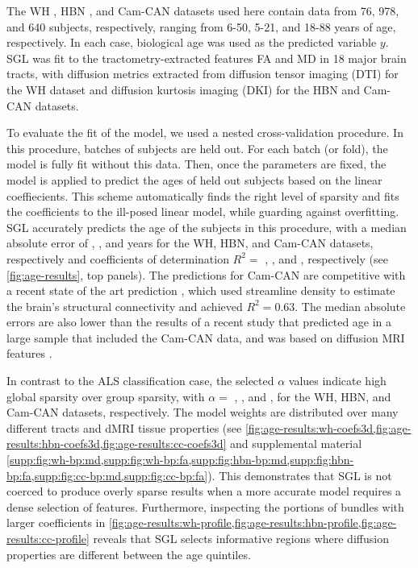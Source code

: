 \documentclass[10pt,%
               aps,%
               prl,%
               preprint,%
               superscriptaddress,%
               preprintnumbers,%
               amsmath,%
               floatfix,%
               endfloats*]{revtex4-1}
\begin{document}
The WH \cite{yeatman2014lifespan}, HBN \cite{alexander2017open}, and Cam-CAN
\cite{shafto2014cambridge,taylor2017cambridge} datasets used here contain
data from 76, 978, and 640 subjects, respectively, ranging from 6-50, 5-21,
and 18-88 years of age, respectively. In each case, biological age was used
as the predicted variable $y$. SGL was fit to the tractometry-extracted
features FA and MD in 18 major brain tracts, with diffusion metrics extracted
from diffusion tensor imaging (DTI) for the WH dataset and diffusion kurtosis
imaging (DKI) \cite{jensen2005diffusion} for the HBN and Cam-CAN datasets.

To evaluate the fit of the model, we used a nested cross-validation
procedure. In this procedure, batches of subjects are held out. For each
batch (or fold), the model is fully fit without this data. Then, once the
parameters are fixed, the model is applied to predict the ages of held out
subjects based on the linear coeffiecients. This scheme automatically finds
the right level of sparsity and fits the coefficients to the ill-posed linear
model, while guarding against overfitting. SGL accurately predicts the age of
the subjects in this procedure, with a median absolute error of {\whMae},
{\hbnMae}, and {\camcanMae} years for the WH, HBN, and Cam-CAN datasets,
respectively and coefficients of determination $R^2 = $ {\whRsq} , {\hbnRsq},
and {\camcanRsq}, respectively (see \cref{fig:age-results}, top panels). The
predictions for Cam-CAN are competitive with a recent state of the art
prediction \cite{mcpherson2020single}, which used streamline density to
estimate the brain's structural connectivity and achieved $R^2 = 0.63$. The
median absolute errors are also lower than the results of a recent study that
predicted age in a large sample that included the Cam-CAN data, and was based
on diffusion MRI features \cite{Richard2018-ux}.

In contrast to the ALS classification case, the selected $\alpha$ values
indicate high global sparsity over group sparsity, with $\alpha = $
{\whLRatio}, {\hbnLRatio}, and {\ccLRatio}, for the WH, HBN, and Cam-CAN
datasets, respectively. The model weights are distributed over many different
tracts and dMRI tissue properties (see
\cref{fig:age-results:wh-coefs3d,fig:age-results:hbn-coefs3d,fig:age-results:cc-coefs3d}
and supplemental material
\cref{supp:fig:wh-bp:md,supp:fig:wh-bp:fa,supp:fig:hbn-bp:md,supp:fig:hbn-bp:fa,supp:fig:cc-bp:md,supp:fig:cc-bp:fa}).
This demonstrates that SGL is not coerced to produce overly sparse results
when a more accurate model requires a dense selection of features.
Furthermore, inspecting the portions of bundles with larger coefficients in
\cref{fig:age-results:wh-profile,fig:age-results:hbn-profile,fig:age-results:cc-profile}
reveals that SGL selects informative regions where diffusion properties are
different between the age quintiles.
\end{document}
